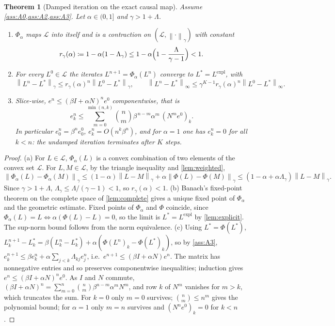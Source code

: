\documentclass[11pt,a4paper]{article}
\theoremstyle{plain}
\newtheorem{theorem}{Theorem}[section]
\theoremstyle{definition}
\theoremstyle{definition}
\newcommand{\norm}[1]{\left\lVert #1 \right\rVert}
\newcommand{\Lev}{L}
\newcommand{\Phimap}{\Phi}
\newcommand{\Phal}{\Phi_\alpha}
\newcommand{\Lset}{\mathcal{L}}
\newcommand{\Lexpl}{\Lev^{\mathrm{expl}}}
\begin{document}
\begin{theorem}[Damped iteration on the exact causal map]\label{thm:causal}
Assume \cref{ass:A0,ass:A2,ass:A3}. Let $\alpha \in (0, 1]$ and $\gamma > 1 + \Lambda$.
\begin{enumerate}
\item[(a)] $\Phal$ maps $\Lset$ into itself and is a contraction on $(\Lset, \norm{\cdot}_\gamma)$ with constant
\[
  r_\gamma(\alpha) \coloneqq 1 - \alpha (1 - \Lambda_\gamma) \le 1 - \alpha \Bigl( 1 - \frac{\Lambda}{\gamma - 1} \Bigr) < 1 .
\]
\item[(b)] For every $\Lev^0 \in \Lset$ the iterates $\Lev^{n+1} = \Phal(\Lev^n)$ converge to $\Lev^* = \Lexpl$, with
\[
  \norm{\Lev^n - \Lev^*}_\gamma \le r_\gamma(\alpha)^n \norm{\Lev^0 - \Lev^*}_\gamma,
  \qquad
  \norm{\Lev^n - \Lev^*}_\infty \le \gamma^{K-1} r_\gamma(\alpha)^n \norm{\Lev^0 - \Lev^*}_\infty .
\]
\item[(c)] Slice-wise, $e^n \le (\beta I + \alpha N)^n e^0$ componentwise, that is
\[
  e^n_k \le \sum_{m = 0}^{\min(n, k)} \binom{n}{m} \beta^{\,n-m} \alpha^m \, (N^m e^0)_k .
\]
In particular $e^n_0 = \beta^n e^0_0$, $e^n_k = O(n^k \beta^n)$, and for $\alpha = 1$ one has $e^n_k = 0$ for all $k < n$: the undamped iteration terminates after $K$ steps.
\end{enumerate}
\end{theorem}

\begin{proof}
(a) For $\Lev \in \Lset$, $\Phal(\Lev)$ is a convex combination of two elements of the convex set $\Lset$. For $\Lev, M \in \Lset$, by the triangle inequality and \cref{lem:weighted},
\[
  \norm{\Phal(\Lev) - \Phal(M)}_\gamma \le (1-\alpha) \norm{\Lev - M}_\gamma + \alpha \norm{\Phimap(\Lev) - \Phimap(M)}_\gamma \le (1 - \alpha + \alpha \Lambda_\gamma) \norm{\Lev - M}_\gamma .
\]
Since $\gamma > 1 + \Lambda$, $\Lambda_\gamma \le \Lambda/(\gamma-1) < 1$, so $r_\gamma(\alpha) < 1$.
(b) Banach's fixed-point theorem on the complete space of \cref{lem:complete} gives a unique fixed point of $\Phal$ and the geometric estimate. Fixed points of $\Phal$ and $\Phimap$ coincide, since $\Phal(\Lev) = \Lev \iff \alpha(\Phimap(\Lev) - \Lev) = 0$, so the limit is $\Lev^* = \Lexpl$ by \cref{lem:explicit}. The sup-norm bound follows from the norm equivalence.
(c) Using $\Lev^* = \Phimap(\Lev^*)$, $\Lev^{n+1}_k - \Lev^*_k = \beta (\Lev^n_k - \Lev^*_k) + \alpha (\Phimap(\Lev^n)_k - \Phimap(\Lev^*)_k)$, so by \cref{ass:A3}, $e^{n+1}_k \le \beta e^n_k + \alpha \sum_{j < k} \Lambda_{kj} e^n_j$, i.e.\ $e^{n+1} \le (\beta I + \alpha N) e^n$. The matrix has nonnegative entries and so preserves componentwise inequalities; induction gives $e^n \le (\beta I + \alpha N)^n e^0$. As $I$ and $N$ commute, $(\beta I + \alpha N)^n = \sum_{m=0}^n \binom{n}{m} \beta^{n-m} \alpha^m N^m$, and row $k$ of $N^m$ vanishes for $m > k$, which truncates the sum. For $k = 0$ only $m = 0$ survives; $\binom{n}{m} \le n^m$ gives the polynomial bound; for $\alpha = 1$ only $m = n$ survives and $(N^n e^0)_k = 0$ for $k < n$.
\end{proof}
\end{document}
